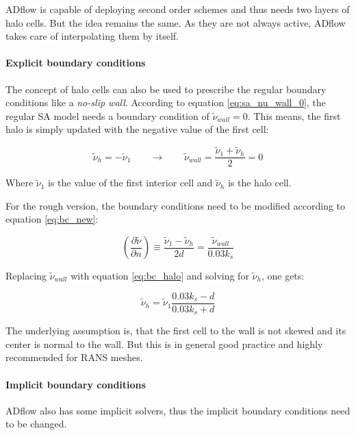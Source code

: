 ADflow is capable of deploying second order schemes and thus needs two layers of
halo cells. But the idea remains the same. As they are not always active, ADflow
takes care of interpolating them by itself.

\paragraph{Explicit boundary conditions}
The concept of halo cells can also be used to prescribe the regular boundary
conditions like a \textit{no-slip wall}. According to equation
\ref{eq:sa_nu_wall_0}, the regular SA model needs a boundary condition of
$\tilde \nu_{wall} = 0$. This means, the first halo is simply updated with the
negative value of the first cell:

\begin{equation}
  \tilde \nu_{h} = - \tilde \nu_{1} \qquad \rightarrow \qquad
  \tilde \nu_{wall} = \frac{\tilde \nu_{1} + \tilde \nu_{h}}{2} = 0
  \label{eq:bc_halo}
\end{equation}

\noindent Where $\tilde \nu_{1}$ is the value of the first interior cell and
$\tilde \nu_{h}$ is the halo cell.

For the rough version, the boundary conditions need to be modified according to
equation \ref{eq:bc_new}:

\begin{equation}
  \left( \frac{\partial \tilde \nu}{\partial n} \right) \equiv
  \frac{\tilde \nu_{1} - \tilde \nu_{h}}{2d} =
  \frac{\tilde \nu_{wall}}{0.03 k_{s}}
\end{equation}

\noindent Replacing $\tilde \nu_{wall}$ with equation \ref{eq:bc_halo} and
solving for $\tilde \nu_{h}$, one gets:

\begin{equation}
  \tilde \nu_{h} = \tilde \nu_{1} \frac{0.03 k_{s} - d}{0.03 k_{s} + d}
\end{equation}

\noindent The underlying assumption is, that the first cell to the wall is not
skewed and its center is normal to the wall. But this is in general good practice
and highly recommended for RANS meshes.


\paragraph{Implicit boundary conditions}
ADflow also has some implicit solvers, thus the implicit boundary conditions need to be changed.

